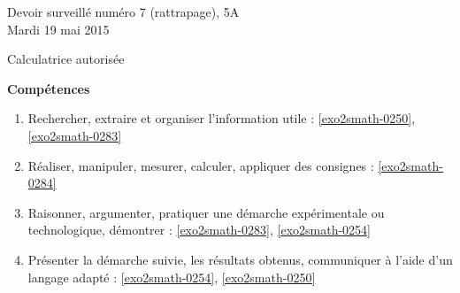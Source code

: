 \documentclass[a4paper,10pt]{article}
\begin{document}
\begin{feuilleDS}{Devoir surveillé numéro 7 (rattrapage), 5A\\ \small Mardi 19 mai 2015}
    \begin{center}
        Calculatrice autorisée
    \end{center}
\vspace{1cm}
{\bf Compétences}
\small
\begin{enumerate}
    \item
        Rechercher, extraire et organiser l'information utile : \ref{exo2smath-0250}, \ref{exo2smath-0283}
    \item
        Réaliser, manipuler, mesurer, calculer, appliquer des consignes : \ref{exo2smath-0284}
    \item
        Raisonner, argumenter, pratiquer une démarche expérimentale ou technologique, démontrer : \ref{exo2smath-0283}, \ref{exo2smath-0254}
    \item 
        Présenter la démarche suivie, les résultats obtenus, communiquer à l'aide d’un langage adapté : \ref{exo2smath-0254}, \ref{exo2smath-0250}
\end{enumerate}
\end{feuilleDS}
\end{document}
